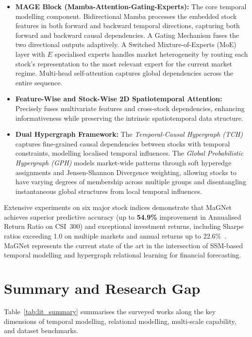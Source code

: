 \documentclass[a4paper,11pt]{report}
\begin{document}
\begin{itemize}
    \item \textbf{MAGE Block (Mamba-Attention-Gating-Experts):} The core temporal modelling component. Bidirectional Mamba processes the embedded stock features in both forward and backward temporal directions, capturing both forward and backward causal dependencies. A Gating Mechanism fuses the two directional outputs adaptively. A Switched Mixture-of-Experts (MoE) layer with $E$ specialised experts handles market heterogeneity by routing each stock's representation to the most relevant expert for the current market regime. Multi-head self-attention captures global dependencies across the entire sequence.
    \item \textbf{Feature-Wise and Stock-Wise 2D Spatiotemporal Attention:} Precisely fuses multivariate features and cross-stock dependencies, enhancing informativeness while preserving the intrinsic spatiotemporal data structure.
    \item \textbf{Dual Hypergraph Framework:} The \emph{Temporal-Causal Hypergraph (TCH)} captures fine-grained causal dependencies between stocks with temporal constraints, modelling localised temporal influences. The \emph{Global Probabilistic Hypergraph (GPH)} models market-wide patterns through soft hyperedge assignments and Jensen-Shannon Divergence weighting, allowing stocks to have varying degrees of membership across multiple groups and disentangling instantaneous global structures from local temporal influences.
\end{itemize}

Extensive experiments on six major stock indices demonstrate that MaGNet achieves superior predictive accuracy (up to \textbf{54.9\%} improvement in Annualised Return Ratio on CSI~300) and exceptional investment returns, including Sharpe ratios exceeding 1.0 on multiple markets and annual returns up to 22.6\%~\cite{tan2025magnet}. MaGNet represents the current state of the art in the intersection of SSM-based temporal modelling and hypergraph relational learning for financial forecasting.

\section{Summary and Research Gap}
\label{sec:gap}

Table~\ref{tab:lit_summary} summarises the surveyed works along the key dimensions of temporal modelling, relational modelling, multi-scale capability, and dataset benchmarks.
\end{document}
